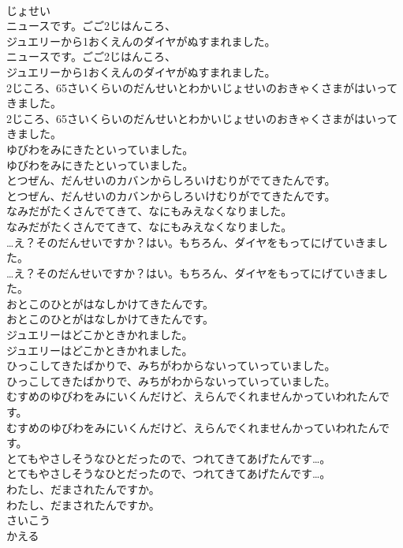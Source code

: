 \documentclass[8pt]{extreport}
\begin{document}
\begin{CJK}{UTF8}{min}
\\	じょせい
\\	ニュースです。ごご2じはんころ、
\\	ジュエリーから1おくえんのダイヤがぬすまれました。
\\	ニュースです。ごご2じはんころ、
\\	ジュエリーから1おくえんのダイヤがぬすまれました。
\\	2じころ、65さいくらいのだんせいとわかいじょせいのおきゃくさまがはいってきました。
\\	2じころ、65さいくらいのだんせいとわかいじょせいのおきゃくさまがはいってきました。
\\	ゆびわをみにきたといっていました。
\\	ゆびわをみにきたといっていました。
\\	とつぜん、だんせいのカバンからしろいけむりがでてきたんです。
\\	とつぜん、だんせいのカバンからしろいけむりがでてきたんです。
\\	なみだがたくさんでてきて、なにもみえなくなりました。
\\	なみだがたくさんでてきて、なにもみえなくなりました。
\\	…え？そのだんせいですか？はい。もちろん、ダイヤをもってにげていきました。
\\	…え？そのだんせいですか？はい。もちろん、ダイヤをもってにげていきました。
\\	おとこのひとがはなしかけてきたんです。
\\	おとこのひとがはなしかけてきたんです。
\\	ジュエリーはどこかときかれました。
\\	ジュエリーはどこかときかれました。
\\	ひっこしてきたばかりで、みちがわからないっていっていました。
\\	ひっこしてきたばかりで、みちがわからないっていっていました。
\\	むすめのゆびわをみにいくんだけど、えらんでくれませんかっていわれたんです。
\\	むすめのゆびわをみにいくんだけど、えらんでくれませんかっていわれたんです。
\\	とてもやさしそうなひとだったので、つれてきてあげたんです…。
\\	とてもやさしそうなひとだったので、つれてきてあげたんです…。
\\	わたし、だまされたんですか。
\\	わたし、だまされたんですか。
\\	さいこう
\\	かえる

\end{CJK}
\end{document}
